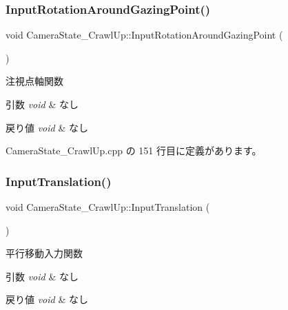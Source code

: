 \subsubsection{\texorpdfstring{Input\+Rotation\+Around\+Gazing\+Point()}{InputRotationAroundGazingPoint()}}
{\footnotesize\ttfamily void Camera\+State\+\_\+\+Crawl\+Up\+::\+Input\+Rotation\+Around\+Gazing\+Point (\begin{DoxyParamCaption}{ }\end{DoxyParamCaption})\hspace{0.3cm}{\ttfamily [private]}}



注視点軸関数 


\begin{DoxyParams}{引数}
{\em void} & なし \\
\hline
\end{DoxyParams}

\begin{DoxyRetVals}{戻り値}
{\em void} & なし \\
\hline
\end{DoxyRetVals}


 Camera\+State\+\_\+\+Crawl\+Up.\+cpp の 151 行目に定義があります。

\mbox{\label{class_camera_state___crawl_up_aca2afe254269bc72330662960a0c6213}} 
\subsubsection{\texorpdfstring{Input\+Translation()}{InputTranslation()}}
{\footnotesize\ttfamily void Camera\+State\+\_\+\+Crawl\+Up\+::\+Input\+Translation (\begin{DoxyParamCaption}{ }\end{DoxyParamCaption})\hspace{0.3cm}{\ttfamily [private]}}



平行移動入力関数 


\begin{DoxyParams}{引数}
{\em void} & なし \\
\hline
\end{DoxyParams}

\begin{DoxyRetVals}{戻り値}
{\em void} & なし \\
\hline
\end{DoxyRetVals}


